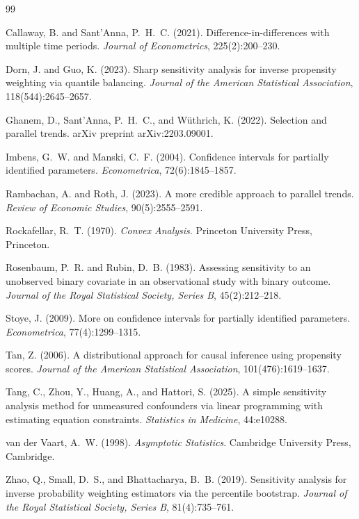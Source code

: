 \documentclass[12pt]{article}
\theoremstyle{remark}
\begin{document}
\begin{thebibliography}{99}

Callaway, B. and Sant'Anna, P.~H.~C. (2021).
Difference-in-differences with multiple time periods.
\emph{Journal of Econometrics}, 225(2):200--230.

Dorn, J. and Guo, K. (2023).
Sharp sensitivity analysis for inverse propensity weighting via quantile balancing.
\emph{Journal of the American Statistical Association}, 118(544):2645--2657.

Ghanem, D., Sant'Anna, P.~H.~C., and W\"uthrich, K. (2022).
Selection and parallel trends.
arXiv preprint arXiv:2203.09001.

Imbens, G.~W. and Manski, C.~F. (2004).
Confidence intervals for partially identified parameters.
\emph{Econometrica}, 72(6):1845--1857.

Rambachan, A. and Roth, J. (2023).
A more credible approach to parallel trends.
\emph{Review of Economic Studies}, 90(5):2555--2591.

Rockafellar, R.~T. (1970).
\emph{Convex Analysis}.
Princeton University Press, Princeton.

Rosenbaum, P.~R. and Rubin, D.~B. (1983).
Assessing sensitivity to an unobserved binary covariate in an observational study with
binary outcome.
\emph{Journal of the Royal Statistical Society, Series B}, 45(2):212--218.

Stoye, J. (2009).
More on confidence intervals for partially identified parameters.
\emph{Econometrica}, 77(4):1299--1315.

Tan, Z. (2006).
A distributional approach for causal inference using propensity scores.
\emph{Journal of the American Statistical Association}, 101(476):1619--1637.

Tang, C., Zhou, Y., Huang, A., and Hattori, S. (2025).
A simple sensitivity analysis method for unmeasured confounders via linear programming
with estimating equation constraints.
\emph{Statistics in Medicine}, 44:e10288.

van der Vaart, A.~W. (1998).
\emph{Asymptotic Statistics}.
Cambridge University Press, Cambridge.

Zhao, Q., Small, D.~S., and Bhattacharya, B.~B. (2019).
Sensitivity analysis for inverse probability weighting estimators via the percentile
bootstrap.
\emph{Journal of the Royal Statistical Society, Series B}, 81(4):735--761.

\end{thebibliography}
\end{document}
